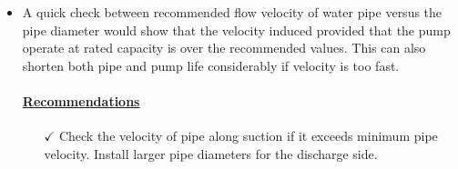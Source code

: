 \begin{itemize}
\begin{itemize}
\end{itemize}


\item A quick check between recommended flow velocity of water pipe versus the pipe diameter would show that the velocity induced provided that the pump operate at rated capacity is over the recommended values. This can also shorten both pipe and pump life considerably if velocity is too fast.



\paragraph{\underline{Recommendations}}
\begin{itemize}
	\item [$\checkmark$] Check the velocity of pipe along suction if it exceeds minimum pipe velocity. Install larger pipe diameters for the discharge side.

\end{itemize}

\end{itemize}

%